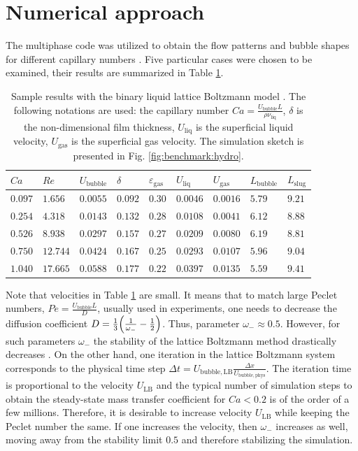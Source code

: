 \documentclass{article}
\newcommand{\lbubble}{L_{\mathrm{bubble}}}
\newcommand{\lslug}{L_{\mathrm{slug}}}
\newcommand{\ububble}{U_{\mathrm{bubble}}}
\newcommand{\uliq}{U_{\mathrm{liq}}}
\newcommand{\ugas}{U_{\mathrm{gas}}}
\newcommand{\omegaminus}{\omega_{-}}
\newcommand{\holdup}{\varepsilon_{\mathrm{gas}}}
\begin{document}
\section{Numerical approach}
\label{sec:numerics}
The multiphase code was utilized to obtain the flow patterns and bubble shapes for different capillary numbers
\cite{kuzmin-binary2d}. Five particular cases were chosen to be examined, their results are summarized
in Table \ref{table:capillary:cases}. 
\begin{table}[htb!]
\begin{tabularx}{\textwidth}{|X|X|X|X|X|X|X|X|X|}
\hline
$Ca$    &$Re$     &$\ububble$ &$\delta$&$\holdup$
&$\uliq$&$\ugas$&$\lbubble$&$\lslug$\\
\hline
$0.097$ &$1.656$  &$0.0055$ &$0.092$ &$0.30$ &$0.0046$&$0.0016$&$5.79$&$9.21$\\ 
$0.254$ &$4.318$  &$0.0143$ &$0.132$ &$0.28$ &$0.0108$&$0.0041$&$6.12$&$8.88$\\ 
$0.526$ &$8.938$  &$0.0297$ &$0.157$ &$0.27$ &$0.0209$&$0.0080$&$6.19$&$8.81$\\
$0.750$ &$12.744$ &$0.0424$ &$0.167$ &$0.25$ &$0.0293$&$0.0107$&$5.96$&$9.04$\\
$1.040$ &$17.665$ &$0.0588$ &$0.177$ &$0.22$ &$0.0397$&$0.0135$&$5.59$&$9.41$\\
\hline
\end{tabularx}
\caption{Sample results with the binary liquid lattice Boltzmann model \cite{kuzmin-binary2d}. The
following notations are used: the capillary number $Ca=\frac{\ububble L}{\rho \nu_{\mathrm{liq}}}$, $\delta$ is the
non-dimensional film thickness, $\uliq$ is the superficial liquid velocity, $\ugas$ is the
superficial gas velocity. The simulation sketch is presented in Fig.
\ref{fig:benchmark:hydro}. \label{table:capillary:cases}}
\end{table}
Note that velocities in Table \ref{table:capillary:cases} are small. It means that to
match large Peclet numbers, $Pe=\frac{\ububble L}{D}$, usually used in experiments, one needs to decrease the diffusion coefficient
$D=\frac{1}{3}\Bigl(\frac{1}{\omegaminus}-\frac{1}{2}\Bigr)$. Thus, parameter $\omegaminus\approx 0.5$. However, for such parameters
$\omegaminus$ the stability of the lattice Boltzmann method drastically decreases
\cite{kuzmin-d1q3}. On the other hand, one iteration in the lattice Boltzmann system corresponds
to the physical time step  $\Delta t=U_{\mathrm{bubble,LB}} \frac{\Delta
x}{U_{\mathrm{bubble,phys}}}$. The iteration time is proportional to the velocity $U_{\mathrm{LB}}$
and the typical number of simulation steps to obtain the steady-state mass transfer coefficient for
$Ca<0.2$ is of the order of a few millions. Therefore, it is desirable to increase  velocity  $U_{\mathrm{LB}}$
while keeping the Peclet number the same. If one increases the velocity, then
$\omegaminus$ increases as well, moving away from the stability limit $0.5$ and therefore
stabilizing the simulation.
 
\end{document}
